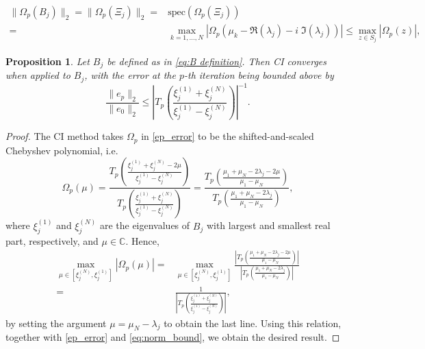 \documentclass[10pt,a4paper]{amsart}
\newtheorem{prop}{Proposition}
\newcommand{\poly}{\Omega}
\newcommand{\sizeA}{N}
\newcommand{\umax}{\mu_{1}}
\newcommand{\umin}{\mu_{\sizeA}}
\begin{document}
		\begin{align}
			\nonumber
			\|  \poly_p(B_j) \|_2 = \|  \poly_p(\Xi_j) \|_2 ={}& \text{spec} ( \poly_p(\Xi_j) ) \\
			\label{eq:norm_bound} ={}& \max_{k = 1, \ldots, \sizeA} |  \poly_p(\mu_k - \Re(\lambda_j) - i\; \Im(\lambda_j))  | \le \max_{{z} \in S_j} |  \poly_p( {z})|,
		\end{align}

		\begin{prop}\label{prop:errorbound}
			Let $B_j$ be defined as in \eqref{eq:B definition}. 
			Then CI converges when applied to $B_j$, with  the error at the $p$-th iteration being bounded above by \begin{equation*}
				\frac{\| {e}_p \|_2}{\| {e}_0 \|_2} \le {\left| T_p \left(\frac{\xi_j^{(1)}+\xi_j^{(N)}}{\xi_j^{(1)}-\xi_j^{(N)}}\right) \right|}^{-1}.\end{equation*}
		\end{prop}

		\begin{proof}
			The CI method takes $\poly_p$ in \eqref{ep_error} to be the shifted-and-scaled Chebyshev polynomial, i.e.
			\begin{equation*}
				{\poly_p(\mu) = \frac{T_p \left( \frac{\xi_j^{(1)} + \xi_j^{(N)} - 2 \mu}{\xi_j^{(1)} - \xi_j^{(N)}} \right)}{T_p \left( \frac{\xi_j^{(1)} + \xi_j^{(N)}}{\xi_j^{(1)} - \xi_j^{(N)}} \right)} =}  \frac{T_p \left(\frac{\umax+\umin-2\lambda_j-2\mu}{\umax-\umin}\right)}{T_p \left(\frac{\umax+\umin-2\lambda_j}{\umax-\umin}\right)},
			\end{equation*}
			where $\xi_j^{(1)}$ and $\xi_j^{(N)}$ are the eigenvalues of $B_j$ with largest and smallest real part, respectively, and $\mu \in \mathbb{C}$.
			Hence,
			\begin{align*}
				\max_{\mu \in [{\xi_j^{(\sizeA)},\xi_j^{(1)}}]} |  \poly_p( \mu) | ={}& \max_{\mu \in [{\xi_j^{(\sizeA)},\xi_j^{(1)}}]} \frac{\left| T_p \left(\frac{\umax+\umin-2\lambda_j-2\mu}{\umax-\umin}\right) \right|}{\left| T_p \left(\frac{\umax+\umin-2\lambda_j}{\umax-\umin}\right) \right|} \\
				={}& \frac{1}{\left|T_p \left( \frac{\xi_j^{(1)} + \xi_j^{(N)}}{\xi_j^{(1)} - \xi_j^{(N)}}  \right)\right|},
			\end{align*}
			by setting the argument {$\mu = \umin- \lambda_j$} to obtain the last line. {Using this relation, together with \eqref{ep_error} and \eqref{eq:norm_bound},
				we obtain the desired result.}
		\end{proof}
\end{document}

